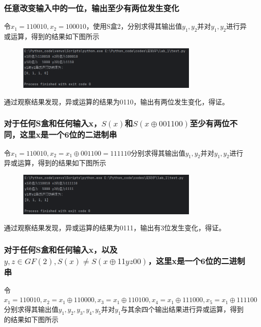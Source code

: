 \documentclass[a4paper,11pt,UTF8]{ctexart}
\newcommand{\bottomcaption}{%
\setlength{\abovecaptionskip}{6pt}%
\setlength{\belowcaptionskip}{6pt}%
\caption}
\newcommand{\xiaowuhao}{\fontsize{9pt}{\baselineskip}\selectfont}   %
\begin{document}
        \subsubsection{任意改变输入中的一位，输出至少有两位发生变化}
            令$x_{1}=110010,x_{2}=100010$，使用S盒2，分别求得其输出值$y_{1},y_{2}$并对$y_{1},y_{2}$进行异或运算，得到的结果如下图所示
            \begin{figure}[H]
                \centering
                \includegraphics[width=9cm]{test_result_2.png}
                \bottomcaption{\xiaowuhao{验正修改一位输入后的输出变化的运行结果}}
            \end{figure}
            通过观察结果发现，异或运算的结果为0110，输出有两位发生变化，得证。

        \subsubsection{对于任何S盒和任何输入x，$S(x)$和$S(x\oplus 001100)$至少有两位不同，这里x是一个6位的二进制串}
            令$x_{1}=110010,x_{2}=x_{1}\oplus 001100=111110$分别求得其输出值$y_{1},y_{2}$并对$y_{1},y_{2}$进行异或运算，得到的结果如下图所示
            \begin{figure}[H]
                \centering
                \includegraphics[width=9cm]{test_result_3.png}
                \bottomcaption{\xiaowuhao{$x\oplus 001100$后的输出变化的运行结果}}
            \end{figure}
            通过观察结果发现，异或运算的结果为0111，输出有3位发生变化，得证。

        \subsubsection{对于任何S盒和任何输入x，以及$y,z\in GF(2),S(x)\ne S(x\oplus 11yz00)$，这里x是一个6位的二进制串}
            令$x_{1}=110010,x_{2}=x_{1}\oplus 110000,x_{3}=x_{1}\oplus 110100,x_{4}=x_{1}\oplus 111000,x_{5}=x_{1}\oplus 111100$
            分别求得其输出值$y_{1},y_{2},y_{3},y_{4},y_{5}$并对$y_{1}$与其余四个输出结果进行异或运算，得到的结果如下图所示
\end{document}

